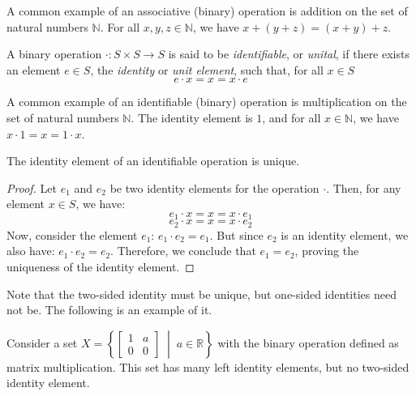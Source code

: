 \documentclass[
	11pt, %
	fleqn, %
	a4paper, %
]{LegrandOrangeBook}
\newcommand{\R}{\mathbb{R}} %
\begin{document}
\begin{example}
    A common example of an associative (binary) operation is addition on the set of natural numbers $\mathbb{N}$. For all $x,y,z \in \mathbb{N}$, we have $x + (y + z) = (x + y) + z$.
\end{example}

\begin{definition}[Identifiable]
    A binary operation $\cdot: S \times S \to S$ is said to be \emph{identifiable}, or \emph{unital}, if there exists an element $e \in S$, the \emph{identity} or \emph{unit element}, such that, for all $x \in S$
    \[ e \cdot x = x = x \cdot e \]
\end{definition}

\begin{example}
    A common example of an identifiable (binary) operation is multiplication on the set of natural numbers $\mathbb{N}$. The identity element is $1$, and for all $x \in \mathbb{N}$, we have $x \cdot 1 = x = 1 \cdot x$.
\end{example}

\begin{proposition}
    The identity element of an identifiable operation is unique.
\end{proposition}

\begin{proof}
    Let $e_1$ and $e_2$ be two identity elements for the operation $\cdot$. Then, for any element $x \in S$, we have:
    \[ e_1 \cdot x = x = x \cdot e_1 \]
    \[ e_2 \cdot x = x = x \cdot e_2 \]
    Now, consider the element $e_1$: $e_1 \cdot e_2 = e_1$.
    But since $e_2$ is an identity element, we also have: $e_1 \cdot e_2 = e_2$.
    Therefore, we conclude that $e_1 = e_2$, proving the uniqueness of the identity element.
\end{proof}

Note that the two-sided identity must be unique, but one-sided identities need not be. The following is an example of it.

\begin{example}
    Consider a set $X = \left\{ \begin{bmatrix}
        1 & a \\
        0 & 0 
    \end{bmatrix} \; \middle| \; a \in \R \right\}$ with the binary operation defined as matrix multiplication. This set has many left identity elements, but no two-sided identity element.
\end{example}
\end{document}
